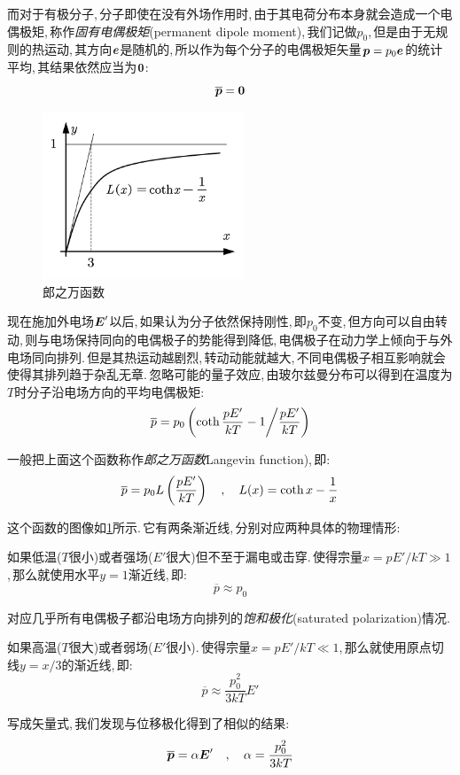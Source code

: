 而对于有极分子,\,分子即使在没有外场作用时,\,由于其电荷分布本身就会造成一个电偶极矩,\,称作\emph{固有电偶极矩}(permanent dipole moment),\,我们记做$p_0$,\,但是由于无规则的热运动,\,其方向$\boldsymbol{e}$是随机的,\,所以作为每个分子的电偶极矩矢量$\boldsymbol{p}=p_0\boldsymbol{e}$的统计平均,\,其结果依然应当为$\boldsymbol{0}$:
\[\overline{\boldsymbol{p}}=\boldsymbol{0}\]

\begin{figure}
\vspace{-0.2cm}
\centering
\includegraphics[width=6cm]{image/7-2-11.png}
\caption{郎之万函数}\label{fig7-2-11}
\end{figure}
现在施加外电场$\boldsymbol{E}'$以后,\,如果认为分子依然保持刚性,\,即$p_0$不变,\,但方向可以自由转动,\,则与电场保持同向的电偶极子的势能得到降低,\,电偶极子在动力学上倾向于与外电场同向排列.\,但是其热运动越剧烈,\,转动动能就越大,\,不同电偶极子相互影响就会使得其排列趋于杂乱无章.\,忽略可能的量子效应,\,由玻尔兹曼分布可以得到在温度为$T$时分子沿电场方向的平均电偶极矩:
\[\overline{p}=p_0\left({\rm coth}\,\frac{pE'}{kT}-1\middle/\frac{pE'}{kT}\right)\]

一般把上面这个函数称作\emph{郎之万函数}Langevin function),\,即:
\[\overline{p}=p_0 L\left(\frac{pE'}{kT}\right)\quad,\quad L(x)={\rm coth}\,x-\frac{1}{x}\]

这个函数的图像如\ref{fig7-2-11}所示.\,它有两条渐近线,\,分别对应两种具体的物理情形:

如果低温($T$很小)或者强场($E'$很大)但不至于漏电或击穿.\,使得宗量$x=pE'/kT\gg 1$,\,那么就使用水平$y=1$渐近线,\,即:
\[\overline{p}\approx p_0\]

对应几乎所有电偶极子都沿电场方向排列的\emph{饱和极化}(saturated polarization)情况.

如果高温($T$很大)或者弱场($E'$很小).\,使得宗量$x=pE'/kT\ll 1$,\,那么就使用原点切线$y=x/3$的渐近线,\,即:
\[\overline{p}\approx \frac{p_0^2}{3kT}E'\]

写成矢量式,\,我们发现与位移极化得到了相似的结果:
\[\overline{\boldsymbol{p}}=\alpha \boldsymbol{E}'\quad,\quad \alpha =\frac{p_0^2}{3kT}\]

